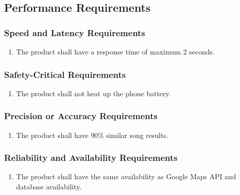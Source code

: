 \documentclass[]{article}
\newcounter{saveenum}
\newcommand{\pauseEnum}{\setcounter{saveenum}{\value{enumi}}}
\newcommand{\resumeEnum}{\setcounter{enumi}{\value{saveenum}}}
\begin{document}
\subsection{Performance Requirements}
\label{sub:performance_requirements}

\subsubsection{Speed and Latency Requirements}
\label{ssub:speed_and_latency_requirements}
\begin{enumerate}[{PR}1. ]
	\item The product shall have a response time of maximum 2 seconds.
	\pauseEnum
\end{enumerate}

\subsubsection{Safety-Critical Requirements}
\label{ssub:safety_critical_requirements}
\begin{enumerate}[{PR}1. ]
	\resumeEnum
	\item The product shall not heat up the phone battery.
	\pauseEnum
\end{enumerate}

\subsubsection{Precision or Accuracy Requirements}
\label{ssub:precision_or_accuracy_requirements}
\begin{enumerate}[{PR}1. ]
	\resumeEnum
	\item The product shall have 90\% similar song results.
	\pauseEnum
\end{enumerate}

\subsubsection{Reliability and Availability Requirements}
\label{ssub:reliability_and_availability_requirements}
\begin{enumerate}[{PR}1. ]
	\resumeEnum
	\item The product shall have the same availability as Google Maps API and database availability.
	\pauseEnum
\end{enumerate}
\end{document}

